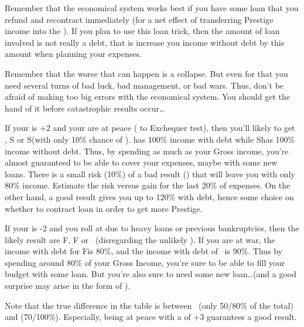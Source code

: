 \begin{playtip}
  \smallskip

  Remember that the economical system works best if you have some loan that
  you refund and recontract immediately (for a net effect of transferring
  Prestige income into the \RT). If you plan to use this loan trick, then the
  amount of loan involved is not really a debt, that is increase you income
  without debt by this amount when planning your expenses.

  \smallskip

  Remember that the worse that can happen is a \RT collapse. But even for that
  you need several turns of bad luck, bad management, or bad wars. Thus, don't
  be afraid of making too big errors with the economical system. You should
  get the hand of it before catastrophic results occur\ldots
\end{playtip}

\begin{exemple}
  If your \STAB is +2 and your are at peace ( to Exchequer test),
  then you'll likely to get \undemi\textetoile, S or S\textetoile (with only
  10\% chance of \undemi). \undemi\textetoile has 100\% income with debt while
  S\textetoile has 100\% income without debt. Thus, by spending as much as
  your Gross income, you're almost guaranteed to be able to cover your
  expenses, maybe with some new loans. There is a small risk (10\%) of a bad
  result (\undemi) that will leave you with only 80\% income. Estimate the
  risk versus gain for the last 20\% of expenses. On the other hand, a good
  result gives you up to 120\% with debt, hence some choice on whether to
  contract loan in order to get more Prestige.

  \smallskip

  If your \STAB is -2 and you roll at  due to heavy loans or
  previous bankruptcies, then the likely result are F\textetoile, F or
  \undemi\ (disregarding the unlikely \undemi\textetoile). If you are at war,
  the income with debt for F\textetoile is 80\%, and the income with debt of
  \undemi\ is 90\%. Thus by spending around 80\% of your Gross Income, you're
  sure to be able to fill your budget with some loan. But you're also sure to
  need some new loan\ldots (and a good surprise may arise in the form of
  \undemi\textetoile).

  \smallskip

  Note that the true difference in the table is between \undemi\ (only 50/80\%
  of the total) and \undemi\textetoile (70/100\%). Especially, being at peace
  with a \STAB of +3 guarantees a good result.
\end{exemple}

